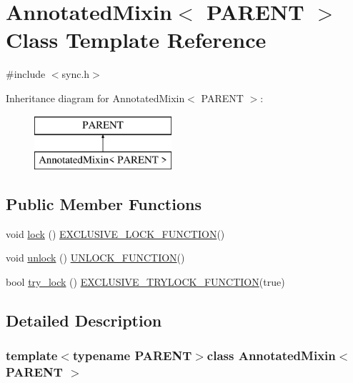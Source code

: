 \hypertarget{class_annotated_mixin}{}\section{Annotated\+Mixin$<$ P\+A\+R\+E\+N\+T $>$ Class Template Reference}
\label{class_annotated_mixin}


{\ttfamily \#include $<$sync.\+h$>$}

Inheritance diagram for Annotated\+Mixin$<$ P\+A\+R\+E\+N\+T $>$\+:\begin{figure}[H]
\begin{center}
\leavevmode
\includegraphics[height=2.000000cm]{class_annotated_mixin}
\end{center}
\end{figure}
\subsection*{Public Member Functions}
\begin{DoxyCompactItemize}
\item 
void \hyperlink{class_annotated_mixin_ad1f35c6d1b8a8e980fff45e7e7cb46d3}{lock} () \hyperlink{threadsafety_8h_a77729163b7f6867da40ad5daa5f926f3}{E\+X\+C\+L\+U\+S\+I\+V\+E\+\_\+\+L\+O\+C\+K\+\_\+\+F\+U\+N\+C\+T\+I\+O\+N}()
\item 
void \hyperlink{class_annotated_mixin_acc2e3da37c2d9dd483b859572e32bc24}{unlock} () \hyperlink{threadsafety_8h_abd56e19f9b4781b1a5212a46951cf5c3}{U\+N\+L\+O\+C\+K\+\_\+\+F\+U\+N\+C\+T\+I\+O\+N}()
\item 
bool \hyperlink{class_annotated_mixin_a9a33deab2da56790d8b5d30b1fd8350d}{try\+\_\+lock} () \hyperlink{threadsafety_8h_a3c67d370ed1f55064d85e01076aad534}{E\+X\+C\+L\+U\+S\+I\+V\+E\+\_\+\+T\+R\+Y\+L\+O\+C\+K\+\_\+\+F\+U\+N\+C\+T\+I\+O\+N}(true)
\end{DoxyCompactItemize}


\subsection{Detailed Description}
\subsubsection*{template$<$typename P\+A\+R\+E\+N\+T$>$class Annotated\+Mixin$<$ P\+A\+R\+E\+N\+T $>$}

